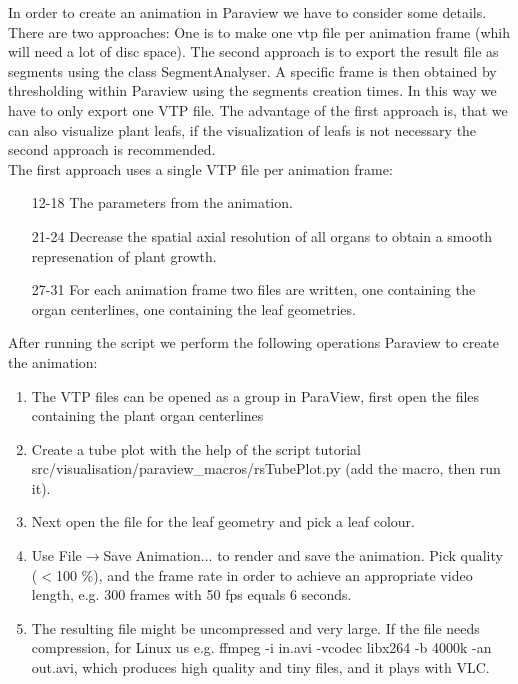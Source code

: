 In order to create an animation in Paraview we have to consider some details. There are two approaches: One is to make one vtp file per animation frame (whih will need a lot of disc space). The second approach is to export the result file as segments using the class SegmentAnalyser. A specific frame is then obtained by thresholding within Paraview using the segments creation times. In this way we have to only export one VTP file. The advantage of the first approach is, that we can also visualize plant leafs, if the visualization of leafs is not necessary the second approach is recommended. \\

The first approach uses a single VTP file per animation frame: 
 
\begin{itemize}
\item[12-18] The parameters from the animation. 
\item[21-24] Decrease the spatial axial resolution of all organs to obtain a smooth represenation of plant growth.
\item[27-31] For each animation frame two files are written, one containing the organ centerlines, one containing the leaf geometries. 
\end{itemize}

After running the script we perform the following operations Paraview to create the animation:
\begin{enumerate}
 \item The VTP files can be opened as a group in ParaView, first open the files containing the plant organ centerlines
 \item Create a tube plot with the help of the script tutorial src/visualisation/paraview\_macros/rsTubePlot.py (add the macro, then run it).
 \item Next open the file for the leaf geometry and pick a leaf colour.
 \item Use File$\rightarrow$Save Animation... to render and save the animation. Pick quality ($<$100 \%), and the frame rate in order to achieve an appropriate video length, e.g. 300 frames with 50 fps equals 6 seconds. 
 \item The resulting file might be uncompressed and very large. If the file needs compression, for Linux us e.g. ffmpeg -i in.avi -vcodec libx264 -b 4000k -an out.avi, which produces high quality and tiny files, and it plays with VLC.
\end{enumerate}



